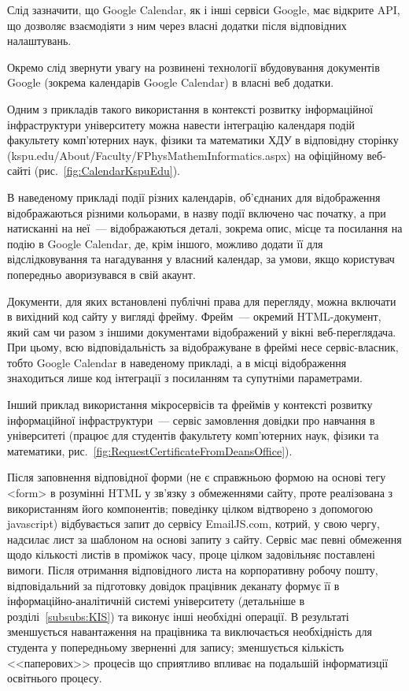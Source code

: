 Слід зазначити, що Google Calendar, як і інші сервіси Google, має відкрите API, що дозволяє взаємодіяти з ним через власні додатки після відповідних налаштувань.

Окремо слід звернути увагу на розвинені технології вбудовування документів Google (зокрема календарів Google Calendar) в власні веб додатки. 

Одним з прикладів такого використання в контексті розвитку інформаційної інфраструктури університету можна навести інтеграцію календаря подій факультету комп'ютерних наук, фізики та математики ХДУ в відповідну сторінку (kspu.edu/About/Faculty/FPhysMathemInformatics.aspx) на офіційному веб-сайті (рис.~\ref{fig:CalendarKspuEdu}).


В наведеному прикладі події різних календарів, об'єднаних для відображення відображаються різними кольорами, в назву події включено час початку, а при натисканні на неї~--- відображаються деталі, зокрема опис, місце та посилання на подію в Google Calendar, де, крім іншого, можливо додати її для відслідковування та нагадування у власний календар, за умови, якщо користувач попередньо аворизувався в свій акаунт.

Документи, для яких встановлені публічні права для перегляду, можна включати в вихідний код сайту у вигляді фрейму. Фрейм~--- окремий HTML-документ, який сам чи разом з іншими документами відображений у вікні веб-переглядача. При цьому, всю відповідальність за відображуване в фреймі несе сервіс-власник, тобто Google Calendar в наведеному прикладі, а в місці відображення знаходиться лише код інтеграції з посиланням та супутніми параметрами.

Інший приклад використання мікросервісів та фреймів у контексті розвитку інформаційної інфраструктури~--- сервіс замовлення довідки про навчання в університеті (працює для студентів факультету комп'ютерних наук, фізики та математики, рис.~\ref{fig:RequestCertificateFromDeansOffice}).


Після заповнення відповідної форми (не є справжньою формою на основі тегу <form> в розумінні HTML у зв'язку з обмеженнями сайту, проте реалізована з використанням його компонентів; поведінку цілком відтворено з допомогою javascript) відбувається запит до сервісу EmailJS.com, котрий, у свою чергу, надсилає лист за шаблоном на основі запиту з сайту. Сервіс має певні обмеження щодо кількості листів в проміжок часу, проце цілком задовільняє поставлені вимоги. Після отримання відповідного листа на корпоративну робочу пошту, відповідальний за підготовку довідок працівник деканату формує її в інформаційно-аналітичній системі університету  (детальніше в розділі~\ref{subsubs:KIS}) та виконує інші необхідні операції. В результаті зменшується навантаження на працівника та виключається необхідність  для студента у попередньому зверненні для запису; зменшується кількість <<паперових>> процесів що сприятливо впливає на подальшій інформатизції освітнього процесу.

